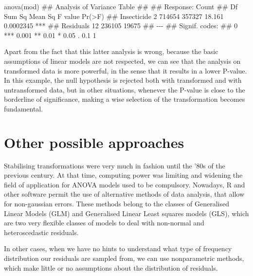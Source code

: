 \documentclass[a4paper,12pt,oneside]{book}
\newenvironment{Shaded}{\begin{snugshade}}{\end{snugshade}}
\newcommand{\DocumentationTok}[1]{#1}
\newcommand{\FunctionTok}[1]{#1}
\newcommand{\NormalTok}[1]{#1}
\begin{document}
\begin{Shaded}
\begin{Highlighting}[]
\FunctionTok{anova}\NormalTok{(mod)}
\DocumentationTok{\#\# Analysis of Variance Table}
\DocumentationTok{\#\# }
\DocumentationTok{\#\# Response: Count}
\DocumentationTok{\#\#             Df Sum Sq Mean Sq F value    Pr(\textgreater{}F)    }
\DocumentationTok{\#\# Insecticide  2 714654  357327  18.161 0.0002345 ***}
\DocumentationTok{\#\# Residuals   12 236105   19675                      }
\DocumentationTok{\#\# {-}{-}{-}}
\DocumentationTok{\#\# Signif. codes:  }
\DocumentationTok{\#\# 0 \textquotesingle{}***\textquotesingle{} 0.001 \textquotesingle{}**\textquotesingle{} 0.01 \textquotesingle{}*\textquotesingle{} 0.05 \textquotesingle{}.\textquotesingle{} 0.1 \textquotesingle{} \textquotesingle{} 1}
\end{Highlighting}
\end{Shaded}

Apart from the fact that this latter analysis is wrong, because the basic assumptions of linear models are not respected, we can see that the analysis on transformed data is more powerful, in the sense that it results in a lower P-value. In this example, the null hypothesis is rejected both with transformed and with untransformed data, but in other situations, whenever the P-value is close to the borderline of significance, making a wise selection of the transformation becomes fundamental.

\hypertarget{other-possible-approaches}{%
\section{Other possible approaches}\label{other-possible-approaches}}

Stabilising transformations were very much in fashion until the '80s of the previous century. At that time, computing power was limiting and widening the field of application for ANOVA models used to be compulsory. Nowadays, R and other software permit the use of alternative methods of data analysis, that allow for non-gaussian errors. These methods belong to the classes of Generalised Linear Models (GLM) and Generalised Linear Least squares models (GLS), which are two very flexible classes of models to deal with non-normal and heteroscedastic residuals.

In other cases, when we have no hints to understand what type of frequency distribution our residuals are sampled from, we can use nonparametric methods, which make little or no assumptions about the distribution of residuals.
\end{document}

